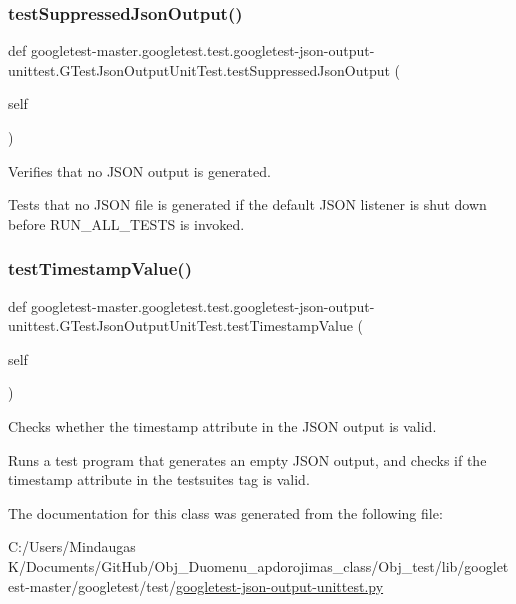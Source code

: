 \subsubsection{\texorpdfstring{testSuppressedJsonOutput()}{testSuppressedJsonOutput()}}
{\footnotesize\ttfamily def googletest-\/master.\+googletest.\+test.\+googletest-\/json-\/output-\/unittest.\+G\+Test\+Json\+Output\+Unit\+Test.\+test\+Suppressed\+Json\+Output (\begin{DoxyParamCaption}\item[{}]{self }\end{DoxyParamCaption})}

\begin{DoxyVerb}Verifies that no JSON output is generated.

Tests that no JSON file is generated if the default JSON listener is
shut down before RUN_ALL_TESTS is invoked.
\end{DoxyVerb}
 \mbox{\label{classgoogletest-master_1_1googletest_1_1test_1_1googletest-json-output-unittest_1_1_g_test_json_output_unit_test_a31863215ce6d1273c347ad76b54a78d5}} 
\subsubsection{\texorpdfstring{testTimestampValue()}{testTimestampValue()}}
{\footnotesize\ttfamily def googletest-\/master.\+googletest.\+test.\+googletest-\/json-\/output-\/unittest.\+G\+Test\+Json\+Output\+Unit\+Test.\+test\+Timestamp\+Value (\begin{DoxyParamCaption}\item[{}]{self }\end{DoxyParamCaption})}

\begin{DoxyVerb}Checks whether the timestamp attribute in the JSON output is valid.

Runs a test program that generates an empty JSON output, and checks if
the timestamp attribute in the testsuites tag is valid.
\end{DoxyVerb}
 

The documentation for this class was generated from the following file\+:\begin{DoxyCompactItemize}
\item 
C\+:/\+Users/\+Mindaugas K/\+Documents/\+Git\+Hub/\+Obj\+\_\+\+Duomenu\+\_\+apdorojimas\+\_\+class/\+Obj\+\_\+test/lib/googletest-\/master/googletest/test/\mbox{\hyperlink{_obj__test_2lib_2googletest-master_2googletest_2test_2googletest-json-output-unittest_8py}{googletest-\/json-\/output-\/unittest.\+py}}\end{DoxyCompactItemize}
